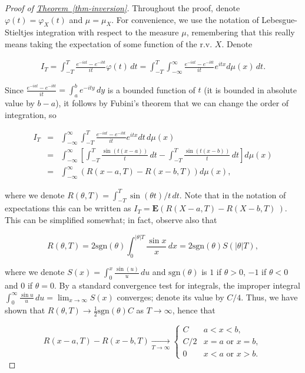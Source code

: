 \begin{proof}[Proof of \texorpdfstring{\hyperref[thm-inversion]{Theorem~\ref*{thm-inversion}}}{Theorem}]
Throughout the proof, denote $\varphi(t)=\varphi_X(t)$
and $\mu=\mu_X$. For convenience, we use the notation
of Lebesgue-Stieltjes integration with respect to the
measure $\mu$, remembering that this really means
taking the expectation of some function of the r.v.
$X$. Denote

\begin{align*}
\tag{12}\label{eq:inversionproof}
I_T = \int_{-T}^T \frac{e^{-i a t}-e^{-i b t}}{it} \varphi(t)\,dt
= \int_{-T}^T \int_{-\infty}^\infty \frac{e^{-i a t}-e^{-i b t}}{it} e^{itx}d\mu(x)\,dt.
\end{align*}

\noindent Since
$\frac{e^{-i a t}-e^{-i b t}}{it} = \int_a^b e^{-i t
y}\,dy$
is a bounded function of $t$ (it is bounded in
absolute value by $b-a$), it follows by Fubini's
theorem that we can change the order of integration,
so

\begin{eqnarray*}
I_T&=& \int_{-\infty}^\infty \int_{-T}^T \frac{e^{-i a t}-e^{-i b t}}{it} e^{itx} dt\,d\mu(x) \\
&=&
\int_{-\infty}^\infty \left[ \int_{-T}^T \frac{\sin(t(x-a))}{t}\,dt-\int_{-T}^T \frac{\sin(t(x-b))}{t}\,dt \right]d\mu(x) \\
&=& \int_{-\infty}^\infty \left( R(x-a,T)-R(x-b,T) \right) d\mu(x),
\end{eqnarray*}

\noindent where we denote
$R(\theta, T) = \int_{-T}^T \sin(\theta t)/t\,dt$.
Note that in the notation of expectations this can be
written as
$I_T = \mathbf{E}\left( R(X-a,T)-R(X-b,T)\ \right)$.
This can be simplified somewhat; in fact, observe also
that

\[
R(\theta,T)= 2\textrm{sgn}(\theta) \int_0^{|\theta|T} \frac{\sin x}{x}\,dx = 2 \textrm{sgn}(\theta) S(|\theta| T),
\]

\noindent where we denote
$S(x) = \int_0^x \frac{\sin(u)}{u}\,du$ and
$\textrm{sgn}(\theta)$ is $1$ if $\theta>0$, $-1$ if
$\theta<0$ and $0$ if $\theta=0$. By a standard
convergence test for integrals, the improper integral
$\int_0^\infty \frac{\sin u}{u}\,du =
\lim_{x\to\infty}S(x)$
converges; denote its value by $C/4$. Thus, we have
shown that
$R(\theta,T)\to \frac12\textrm{sgn}(\theta) C$ as
$T\to \infty$, hence that

\[
R(x-a,T)-R(x-b,T) \xrightarrow[T\to\infty]{} \begin{cases}
C & a<x<b, \\
C/2 & x=a\textrm{ or }x=b, \\
0 & x<a\textrm{ or }x>b.
\end{cases}
\]


\end{proof}
